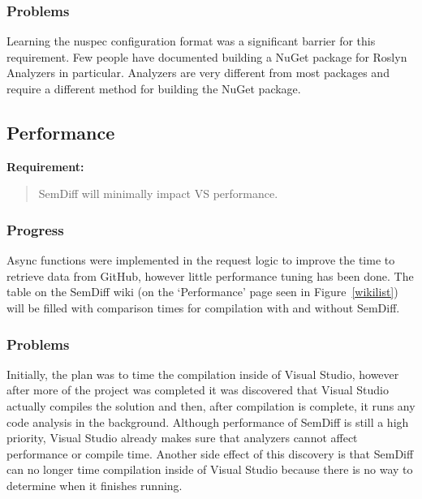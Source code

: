 \documentclass[draftclsnofoot,onecolumn]{IEEEtran}
\begin{document}
\subsubsection{Problems}

Learning the nuspec configuration format was a significant barrier for this 
requirement. Few people have documented building a NuGet package for Roslyn 
Analyzers in particular. Analyzers are very different from most packages and 
require a different method for building the NuGet package. 

\subsection{Performance}%

\textbf{Requirement:}

\begin{quote}

SemDiff will minimally impact VS performance.

\end{quote}

\subsubsection{Progress}

Async functions were implemented in the request logic to improve the time to 
retrieve data from GitHub, however little performance tuning has been done. 
The table on the SemDiff wiki (on the ‘Performance’ page seen in 
Figure~\ref{wikilist}) will be filled with comparison times for compilation 
with and without SemDiff. 

\subsubsection{Problems}

Initially, the plan was to time the compilation inside of Visual Studio, 
however after more of the project was completed it was discovered that Visual 
Studio actually compiles the solution and then, after compilation is 
complete, it runs any code analysis in the background. Although performance 
of SemDiff is still a high priority, Visual Studio already makes sure that 
analyzers cannot affect performance or compile time. Another side effect of 
this discovery is that SemDiff can no longer time compilation inside of 
Visual Studio because there is no way to determine when it finishes running.
 
\end{document}
